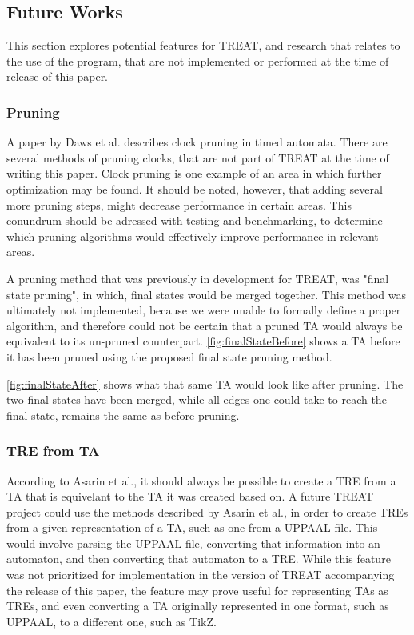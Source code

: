 \subsection{Future Works}\label{subsec:futureWorks}
This section explores potential features for TREAT, and research that relates to the use of the program, that are not implemented or performed at the time of release of this paper.

\subsubsection{Pruning}\label{futureWorks:pruning}
A paper by Daws et al. \cite{Daws1996} describes clock pruning in timed automata. There are several methods of pruning clocks, that are not part of TREAT at the time of writing this paper.
Clock pruning is one example of an area in which further optimization may be found. It should be noted, however, that adding several more pruning steps, might decrease performance in certain areas.
This conundrum should be adressed with testing and benchmarking, to determine which pruning algorithms would effectively improve performance in relevant areas.

A pruning method that was previously in development for TREAT, was "final state pruning", in which, final states would be merged together. This method was ultimately not implemented, because we were unable to formally define a proper algorithm, and therefore could not be certain that a pruned TA would always be equivalent to its un-pruned counterpart.
\cref{fig:finalStateBefore} shows a TA before it has been pruned using the proposed final state pruning method.



\cref{fig:finalStateAfter} shows what that same TA would look like after pruning. The two final states have been merged, while all edges one could take to reach the final state, remains the same as before pruning.




\subsubsection{TRE from TA}
According to Asarin et al.\cite{Eugene2001}, it should always be possible to create a TRE from a TA that is equivelant to the TA it was created based on.
A future TREAT project could use the methods described by Asarin et al., in order to create TREs from a given representation of a TA, such as one from a UPPAAL file.
This would involve parsing the UPPAAL file, converting that information into an automaton, and then converting that automaton to a TRE.
While this feature was not prioritized for implementation in the version of TREAT accompanying the release of this paper, the feature may prove useful for representing TAs as TREs, and even converting a TA originally represented in one format, such as UPPAAL, to a different one, such as TikZ.

